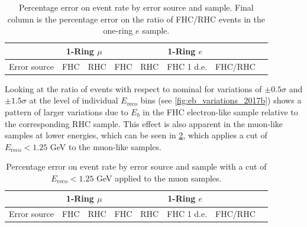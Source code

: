 \begin{table}[H]
	\centering
	\begin{tabular}{|l||l|l||l|l|l|l|l|}
		\hline
		& \multicolumn{2}{c||}{\textbf{1-Ring $\mu$}} & \multicolumn{4}{c|}{\textbf{1-Ring $e$}} \\ \hline
		Error source & FHC & RHC & FHC & RHC & FHC 1 d.e. & FHC/RHC \\ \hline\hline
		
		
		
		
		
		
		
		\hline
		
		
	\end{tabular}
	\caption
	{
	Percentage error on event rate by error source and sample. Final column is the percentage error on the ratio of FHC/RHC events in the one-ring $e$ sample.
	}
	\label{tab:sk_errors_summary_2017b}
\end{table}

Looking at the ratio of events with respect to nominal for variations of $\pm0.5\sigma$ and $\pm1.5\sigma$ at the level of individual $E_\text{reco}$ bins (see \cref{fig:eb_variations_2017b}) shows a pattern of larger variations due to $E_b$ in the FHC electron-like sample relative to the corresponding RHC sample. This effect is also apparent in the muon-like samples at lower energies, which can be seen in \cref{tab:sk_errors_summary_2017b_cut}, which applies a cut of $E_\text{reco} < 1.25$ GeV to the muon-like samples.

\begin{table}[H]
	\centering
	\begin{tabular}{|l||l|l||l|l|l|l|l|}
		\hline
		& \multicolumn{2}{c||}{\textbf{1-Ring $\mu$}} & \multicolumn{4}{c|}{\textbf{1-Ring $e$}} \\ \hline
		Error source & FHC & RHC & FHC & RHC & FHC 1 d.e. & FHC/RHC \\ \hline\hline
		
		
		
		
		
		
		
		\hline
		
		
	\end{tabular}
	\caption
	{
	Percentage error on event rate by error source and sample with a cut of $E_\text{reco} < 1.25$ GeV applied to the muon samples.
	}
	\label{tab:sk_errors_summary_2017b_cut}
\end{table}
